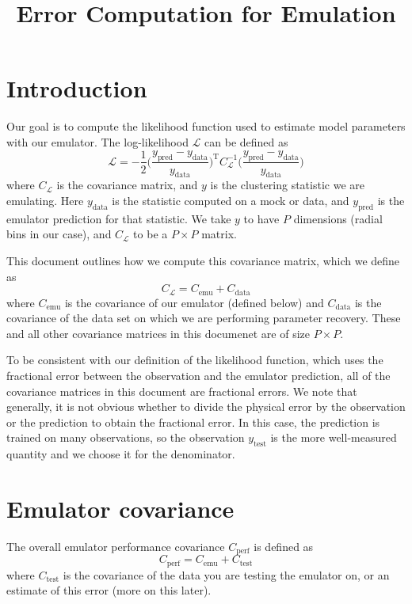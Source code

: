 \documentclass[12pt]{article}
\title{Error Computation for Emulation}
\newcommand{\T}{^{\mathrm{T}}}
\newcommand{\inv}{^{-1}}
\newcommand{\like}{\mathcal{L}}
\newcommand{\cov}[1]{C_\text{#1}}
\newcommand{\covtot}{C_\like}
\newcommand{\y}[1]{y_{\text{#1}}}
\begin{document}
\maketitle


\section{Introduction}

Our goal is to compute the likelihood function used to estimate model parameters with our emulator.
The log-likelihood $\like$ can be defined as 
\begin{equation}
    \like = -\frac{1}{2} \bigg( \frac{\y{pred} - \y{data}}{\y{data}} \bigg)\T \covtot\inv \bigg( \frac{\y{pred} - \y{data}}{\y{data}} \bigg)
\end{equation}
where $\covtot$ is the covariance matrix, and $y$ is the clustering statistic we are emulating.
Here $\y{data}$ is the statistic computed on a mock or data, and $\y{pred}$ is the emulator prediction for that statistic. 
We take $y$ to have $P$ dimensions (radial bins in our case), and $\covtot$ to be a $P \times P$ matrix.

This document outlines how we compute this covariance matrix, which we define as
\label{eq:covtot}
\begin{equation}
    \covtot = \cov{emu} + \cov{data}
\end{equation}
where $\cov{emu}$ is the covariance of our emulator (defined below) and $\cov{data}$ is the covariance of the data set on which we are performing parameter recovery.
These and all other covariance matrices in this documenet are of size $P \times P$.

To be consistent with our definition of the likelihood function, which uses the fractional error between the observation and the emulator prediction, all of the covariance matrices in this document are fractional errors.
We note that generally, it is not obvious whether to divide the physical error by the observation or the prediction to obtain the fractional error.
In this case, the prediction is trained on many observations, so the observation $\y{test}$ is the more well-measured quantity and we choose it for the denominator.


\section{Emulator covariance}

The overall emulator performance covariance $\cov{perf}$ is defined as
\begin{equation}
    \cov{perf} = \cov{emu} + \cov{test}
\end{equation}
where $\cov{test}$ is the covariance of the data you are testing the emulator on, or an estimate of this error (more on this later).
\end{document}
